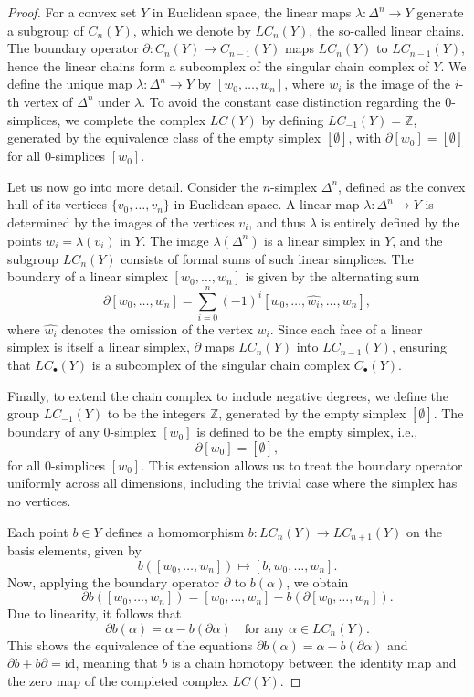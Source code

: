 \begin{proof}
For a convex set \(Y\) in Euclidean space, the linear maps \(\lambda: \Delta^n \rightarrow Y\) generate a subgroup of \(C_n(Y)\), which we denote by \(LC_n(Y)\), the so-called linear chains. The boundary operator \(\partial: C_n(Y) \rightarrow C_{n-1}(Y)\) maps \(LC_n(Y)\) to \(LC_{n-1}(Y)\), hence the linear chains form a subcomplex of the singular chain complex of \(Y\). We define the unique map \(\lambda: \Delta^n \rightarrow Y\) by \([w_0, \ldots, w_n]\), where \(w_i\) is the image of the \(i\)-th vertex of \(\Delta^n\) under \(\lambda\). To avoid the constant case distinction regarding the \(0\)-simplices, we complete the complex \(LC(Y)\) by defining \(LC_{-1}(Y) = \mathbb{Z}\), generated by the equivalence class of the empty simplex \([\emptyset]\), with \(\partial[w_0] = [\emptyset]\) for all \(0\)-simplices \([w_0]\).

Let us now go into more detail. Consider the \(n\)-simplex \(\Delta^n\), defined as the convex hull of its vertices \(\{v_0, \ldots, v_n\}\) in Euclidean space. A linear map \(\lambda: \Delta^n \rightarrow Y\) is determined by the images of the vertices \(v_i\), and thus \(\lambda\) is entirely defined by the points \(w_i = \lambda(v_i)\) in \(Y\). The image \(\lambda(\Delta^n)\) is a linear simplex in \(Y\), and the subgroup \(LC_n(Y)\) consists of formal sums of such linear simplices. The boundary of a linear simplex \([w_0, \ldots, w_n]\) is given by the alternating sum
\[
\partial[w_0, \ldots, w_n] = \sum_{i=0}^n (-1)^i [w_0, \ldots, \hat{w_i}, \ldots, w_n],
\]
where \(\hat{w_i}\) denotes the omission of the vertex \(w_i\). Since each face of a linear simplex is itself a linear simplex, \(\partial\) maps \(LC_n(Y)\) into \(LC_{n-1}(Y)\), ensuring that \(LC_\bullet(Y)\) is a subcomplex of the singular chain complex \(C_\bullet(Y)\).

Finally, to extend the chain complex to include negative degrees, we define the group \(LC_{-1}(Y)\) to be the integers \(\mathbb{Z}\), generated by the empty simplex \([\emptyset]\). The boundary of any \(0\)-simplex \([w_0]\) is defined to be the empty simplex, i.e.,
\[
\partial[w_0] = [\emptyset],
\]
for all \(0\)-simplices \([w_0]\). This extension allows us to treat the boundary operator uniformly across all dimensions, including the trivial case where the simplex has no vertices.

Each point \(b \in Y\) defines a homomorphism \(b: LC_n(Y) \rightarrow LC_{n+1}(Y)\) on the basis elements, given by 
\[
b([w_0, \ldots, w_n]) \mapsto [b, w_0, \ldots, w_n].
\]
Now, applying the boundary operator \(\partial\) to \(b(\alpha)\), we obtain
\[
\partial b([w_0, \ldots, w_n]) = [w_0, \ldots, w_n] - b(\partial [w_0, \ldots, w_n]).
\]
Due to linearity, it follows that 
\[
\partial b(\alpha) = \alpha - b(\partial \alpha) \quad \text{for any } \alpha \in LC_n(Y).
\]
This shows the equivalence of the equations \(\partial b(\alpha) = \alpha - b(\partial \alpha)\) and \(\partial b + b \partial = \text{id}\), meaning that \(b\) is a chain homotopy between the identity map and the zero map of the completed complex \(LC(Y)\).
\end{proof}

